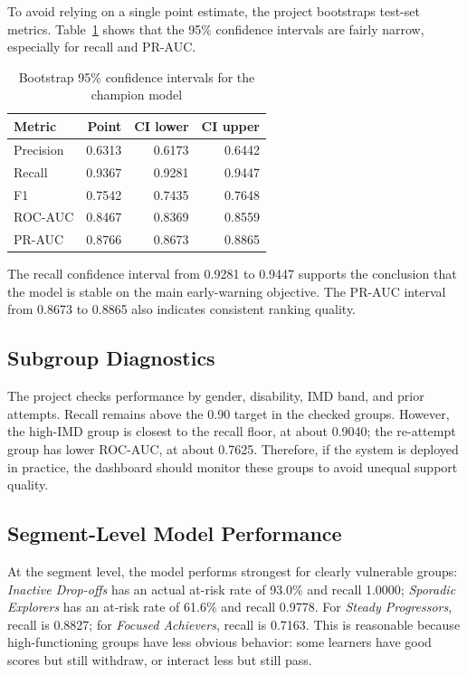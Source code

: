 \documentclass[conference]{IEEEtran}
\begin{document}
To avoid relying on a single point estimate, the project bootstraps test-set metrics. Table~\ref{tab:bootstrap} shows that the 95\% confidence intervals are fairly narrow, especially for recall and PR-AUC.

\begin{table}[H]
\centering
\footnotesize
\caption{Bootstrap 95\% confidence intervals for the champion model}
\label{tab:bootstrap}
\begin{tabular}{lrrr}
\toprule
Metric & Point & CI lower & CI upper \\
\midrule
Precision & 0.6313 & 0.6173 & 0.6442 \\
Recall & 0.9367 & 0.9281 & 0.9447 \\
F1 & 0.7542 & 0.7435 & 0.7648 \\
ROC-AUC & 0.8467 & 0.8369 & 0.8559 \\
PR-AUC & 0.8766 & 0.8673 & 0.8865 \\
\bottomrule
\end{tabular}
\end{table}

The recall confidence interval from 0.9281 to 0.9447 supports the conclusion that the model is stable on the main early-warning objective. The PR-AUC interval from 0.8673 to 0.8865 also indicates consistent ranking quality.

\subsection{Subgroup Diagnostics}

The project checks performance by gender, disability, IMD band, and prior attempts. Recall remains above the 0.90 target in the checked groups. However, the high-IMD group is closest to the recall floor, at about 0.9040; the re-attempt group has lower ROC-AUC, at about 0.7625. Therefore, if the system is deployed in practice, the dashboard should monitor these groups to avoid unequal support quality.

\subsection{Segment-Level Model Performance}

At the segment level, the model performs strongest for clearly vulnerable groups: \textit{Inactive Drop-offs} has an actual at-risk rate of 93.0\% and recall 1.0000; \textit{Sporadic Explorers} has an at-risk rate of 61.6\% and recall 0.9778. For \textit{Steady Progressors}, recall is 0.8827; for \textit{Focused Achievers}, recall is 0.7163. This is reasonable because high-functioning groups have less obvious behavior: some learners have good scores but still withdraw, or interact less but still pass.
\end{document}

